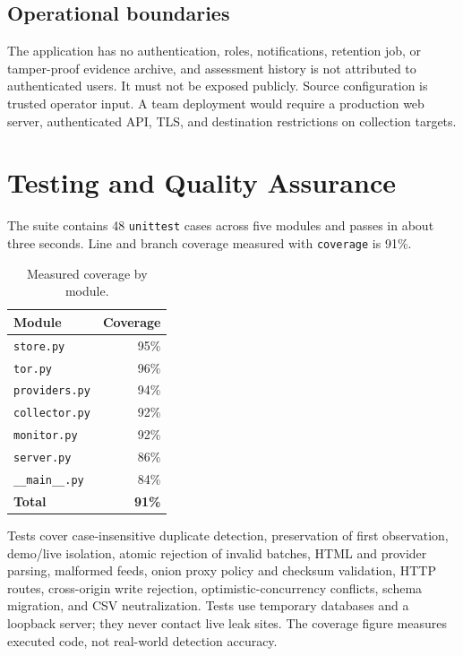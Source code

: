 \documentclass[11pt,a4paper]{article}
\newcommand{\code}[1]{\texttt{\small #1}}
\begin{document}
\subsection{Operational boundaries}
The application has no authentication, roles, notifications, retention job, or tamper-proof evidence archive, and assessment history is not attributed to authenticated users. It must not be exposed publicly. Source configuration is trusted operator input. A team deployment would require a production web server, authenticated API, TLS, and destination restrictions on collection targets.

\section{Testing and Quality Assurance}
The suite contains 48 \code{unittest} cases across five modules and passes in about three seconds. Line and branch coverage measured with \code{coverage} is 91\%.

\begin{table}[H]
\centering
\renewcommand{\arraystretch}{1.15}
\begin{tabular}{@{}l r@{}}
\toprule
\textbf{Module} & \textbf{Coverage} \\
\midrule
\code{store.py} & 95\% \\
\code{tor.py} & 96\% \\
\code{providers.py} & 94\% \\
\code{collector.py} & 92\% \\
\code{monitor.py} & 92\% \\
\code{server.py} & 86\% \\
\code{\_\_main\_\_.py} & 84\% \\
\midrule
\textbf{Total} & \textbf{91\%} \\
\bottomrule
\end{tabular}
\caption{Measured coverage by module.}
\end{table}

Tests cover case-insensitive duplicate detection, preservation of first observation, demo/live isolation, atomic rejection of invalid batches, HTML and provider parsing, malformed feeds, onion proxy policy and checksum validation, HTTP routes, cross-origin write rejection, optimistic-concurrency conflicts, schema migration, and CSV neutralization. Tests use temporary databases and a loopback server; they never contact live leak sites. The coverage figure measures executed code, not real-world detection accuracy.
\end{document}

